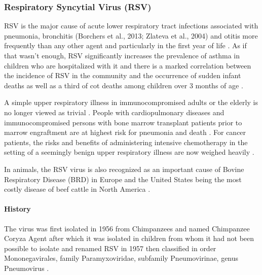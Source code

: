 \documentclass[10pt, a4paper]{article}
\begin{document}
\subsubsection{Respiratory Syncytial Virus (RSV)}
\label{sec:org1844af5}
RSV is the major cause of acute lower respiratory tract infections associated 
with pneumonia, bronchitis (Borchers et al., 2013; Zlateva et al., 2004) and
otitis \cite{kleinRoleRespiratorySyncytial1982} more frequently than any other agent and
particularly in the first year of life \cite{stottRespiratorySyncytialVirus1985}.
As if that wasn’t enough, RSV significantly increases the prevalence of asthma
in children who are hospitalized with it and there is a marked correlation
between the incidence of RSV in the community and the occurrence of sudden
infant deaths as well as a third of cot deaths among children over 3 months of
age \cite{chanockRecoveryInfantsRespiratory1957}. 

A simple upper respiratory illness in immunocompromised adults or the elderly
is no longer viewed as trivial
\cite{chanockRecoveryInfantsRespiratory1957,whimbeyRespiratorySyncytialVirus2000}.
People with cardiopulmonary diseases and immunocompromised persons with bone
marrow transplant patients prior to marrow engraftment are at highest risk for
pneumonia and death \cite{morrisRecoveryCytopathogenicAgent1956}.
For cancer patients, the risks and
benefits of administering intensive chemotherapy in the setting of a seemingly
benign upper respiratory illness are now weighed heavily
\cite{kleinRoleRespiratorySyncytial1982}.

In animals, the RSV virus is also recognized as an important cause of Bovine
Respiratory Disease (BRD) in Europe and the United States
\cite{whimbeyRespiratorySyncytialVirus2000} being the most costly disease of beef
cattle in North America \cite{griffinEconomicImpactAssociated1997}.

\paragraph{History}
\label{sec:orgb6ec906}
The virus was first isolated in 1956 from Chimpanzees and named Chimpanzee
Coryza Agent \cite{morrisRecoveryCytopathogenicAgent1956} after which it was
isolated in children from whom it had not been possible to isolate and renamed 
RSV in 1957 then classified in order Mononegavirales, family Paramyxoviridae,
subfamily Pneumovirinae, genus Pneumovirus
\cite{chanockRecoveryInfantsRespiratory1957,beemAssociationChimpanzeeCoryza1960,zlatevaGeneticVariabilityMolecular2005}.
\end{document}
